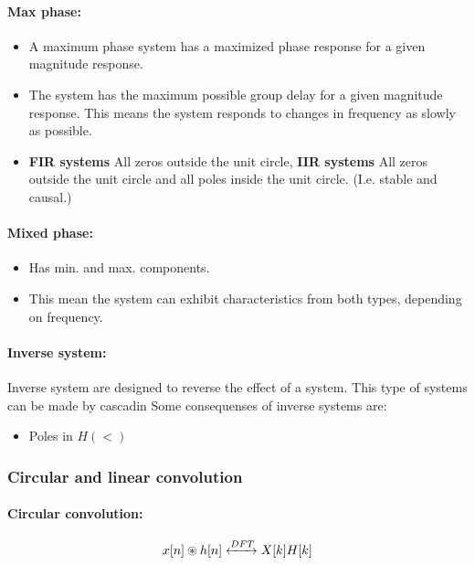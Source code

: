 \documentclass{article}
\begin{document}
\paragraph{Max phase:}
\begin{itemize}
    \item A maximum phase system has a maximized phase response for a given magnitude response.
    \item The system has the maximum possible group delay for a given magnitude response. This means the system responds to changes in frequency as slowly as possible.
    \item \textbf{FIR systems} All zeros outside the unit circle, \textbf{IIR systems} All zeros outside the unit circle and all poles inside the unit circle. (I.e. stable and causal.)
\end{itemize}

\paragraph{Mixed phase:}
\begin{itemize}
    \item Has min. and max. components.
    \item This mean the system can exhibit characteristics from both types, depending on frequency.
\end{itemize}

\paragraph{Inverse system:}
Inverse system are designed to reverse the effect of a system. This type of systems can be made by cascadin
 Some consequenses of inverse systems are:
\begin{itemize}
    \item Poles in $H(<)$
\end{itemize}

\subsubsection{Circular and linear convolution}
\paragraph{Circular convolution:}
\begin{equation}
    x[n] \circledast h[n] \xleftrightarrow{DFT} X[k]H[k]
\end{equation}
\end{document}
